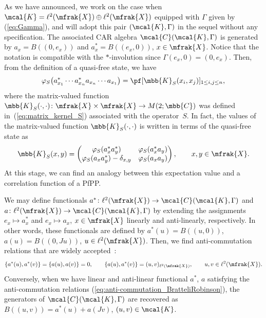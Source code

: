 As we have announced, we work on the case when $\mcal{K}=\ell^{2}(\mfrak{X})\oplus\ell^{2}(\mfrak{X})$ equipped with $\Gamma$ given by (\ref{eq:Gamma}), and will adopt this pair $(\mcal{K},\Gamma)$ in the sequel without any specification.
The associated CAR algebra $\mcal{C}(\mcal{K},\Gamma)$ is generated by $a_{x}=B((0,e_{x}))$ and $a_{x}^{\ast}=B((e_{x},0))$, $x\in\mfrak{X}$.
Notice that the notation is compatible with the $\ast$-involution since $\Gamma (e_{x},0)=(0,e_{x})$.
Then, from the definition of a quasi-free state, we have
\begin{equation}
\label{eq:quasifree_correlation_function}
	\varphi_{S}\big(a_{x_{1}}^{\ast} \cdots a_{x_{n}}^{\ast}a_{x_{n}}\cdots a_{x_{1}}\big)=\pf [\mbb{K}_{S}(x_{i},x_{j}) ]_{1\le i,j\le n},
\end{equation}
where the matrix-valued function $\mbb{K}_{S}(\cdot,\cdot)\colon \mfrak{X}\times\mfrak{X}\to M(2;\mbb{C})$ was defined in~(\ref{eq:matrix_kernel_S}) associated with the operator~$S$. In fact, the values of the matrix-valued function $\mbb{K}_{S}(\cdot,\cdot)$ is written in terms of the quasi-free state as
\begin{equation*}
	\mbb{K}_{S}(x,y)=\left(
	\begin{matrix}
	\varphi_{S}(a_{x}^{\ast}a_{y}^{\ast}) & \varphi_{S}(a_{x}^{\ast}a_{y}) \\
	\varphi_{S}(a_{x}a_{y}^{\ast})-\delta_{x,y} & \varphi_{S}(a_{x}a_{y})
	\end{matrix}
	\right),\qquad x,y\in\mfrak{X}.
\end{equation*}
At this stage, we can find an analogy between this expectation value and a correlation function of a PfPP.

\begin{Remark}\label{rem:equivalence_CAR}
We may define functionals $a^{\ast}\colon \ell^{2}(\mfrak{X})\to \mcal{C}(\mcal{K},\Gamma)$ and $a\colon \ell^{2}(\mfrak{X})\to \mcal{C}(\mcal{K},\Gamma)$ by extending the assignments $e_{x}\mapsto a_{x}^{\ast}$ and $e_{x}\mapsto a_{x}$, $x\in\mfrak{X}$ linearly and anti-linearly, respectively. In other words, these functionals are defined by $a^{\ast}(u)=B((u,0))$, $a(u)=B((0,Ju))$, $u\in \ell^{2}(\mfrak{X})$.
Then, we find anti-commutation relations that are widely accepted~\cite{BratteliRobinson1997}:
\begin{gather}\label{eq:anti-commutation_BratteliRobinson}
	 \{a^{\ast}(u),a^{\ast}(v)\}=\{a(u),a(v)\}=0, \qquad
	 \{a(u),a^{\ast}(v)\}=(u,v)_{\ell^{2}(\mfrak{X})}, \qquad u,v\in \ell^{2}(\mfrak{X}).
\end{gather}
Conversely, when we have linear and anti-linear functional $a^{\ast}$, $a$ satisfying the anti-commutation relations (\ref{eq:anti-commutation_BratteliRobinson}), the generators of $\mcal{C}(\mcal{K},\Gamma)$ are recovered as $B((u,v))=a^{\ast}(u)+a(Jv)$, $(u,v)\in\mcal{K}$.
\end{Remark}

